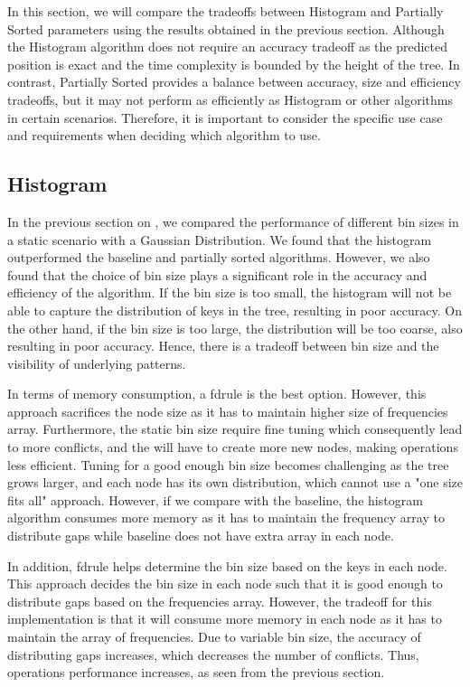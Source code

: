 In this section, we will compare the tradeoffs between Histogram and Partially Sorted parameters using the results obtained in the previous section. Although the Histogram algorithm does not require an accuracy tradeoff as the predicted position is exact and the time complexity is bounded by the height of the tree. In contrast, Partially Sorted provides a balance between accuracy, size and efficiency tradeoffs, but it may not perform as efficiently as Histogram or other algorithms in certain scenarios. Therefore, it is important to consider the specific use case and requirements when deciding which algorithm to use.

\subsection{Histogram}
In the previous section on , we compared the performance of different bin sizes in a static scenario with a Gaussian Distribution. We found that the histogram outperformed the baseline and partially sorted algorithms. However, we also found that the choice of bin size plays a significant role in the accuracy and efficiency of the algorithm. If the bin size is too small, the histogram will not be able to capture the distribution of keys in the tree, resulting in poor accuracy. On the other hand, if the bin size is too large, the distribution will be too coarse, also resulting in poor accuracy. Hence, there is a tradeoff between bin size and the visibility of underlying patterns.

In terms of memory consumption, a \acrshort{fdrule} is the best option. However, this approach sacrifices the node size as it has to maintain higher size of frequencies array. Furthermore, the static bin size require fine tuning which consequently lead to more conflicts, and the \learnindex will have to create more new nodes, making operations less efficient. Tuning for a good enough bin size becomes challenging as the tree grows larger, and each node has its own distribution, which cannot use a "one size fits all" approach. However, if we compare with the baseline, the histogram algorithm consumes more memory as it has to maintain the frequency array to distribute gaps while baseline does not have extra array in each node.

In addition, \acrshort{fdrule} helps determine the bin size based on the keys in each node. This approach decides the bin size in each node such that it is good enough to distribute gaps based on the frequencies array. However, the tradeoff for this implementation is that it will consume more memory in each node as it has to maintain the array of frequencies. Due to variable bin size, the accuracy of distributing gaps increases, which decreases the number of conflicts. Thus, operations performance increases, as seen from the previous section.

